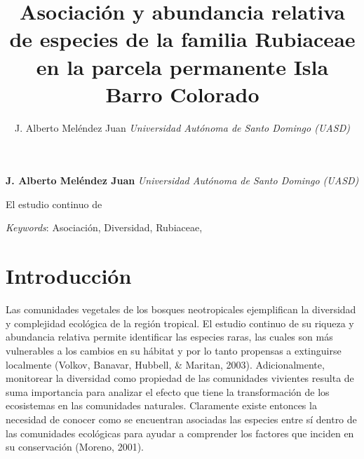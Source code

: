 \documentclass[11pt,]{article}
\title{Asociación y abundancia relativa de especies de la familia Rubiaceae en
la parcela permanente Isla Barro Colorado  }
\author{\Large J. Alberto Meléndez Juan\vspace{0.05in} \newline\normalsize\emph{Universidad Autónoma de Santo Domingo (UASD)}  }
\date{}
\newcommand*{\authorfont}{\fontfamily{phv}\selectfont}
\renewenvironment{abstract}
 {{%
    \setlength{\leftmargin}{0mm}
    \setlength{\rightmargin}{\leftmargin}%
  }%
  \relax}
 {\endlist}
\begin{document}
	
%

{%
\setlength{\parindent}{0pt}
\thispagestyle{plain}
{\fontsize{18}{20}\selectfont\raggedright 
\maketitle  %

}

{
   \vskip 13.5pt\relax \normalsize\fontsize{11}{12} 
\textbf{\authorfont J. Alberto Meléndez Juan} \hskip 15pt \emph{\small Universidad Autónoma de Santo Domingo (UASD)}   

}

}








\begin{abstract}

    \hbox{\vrule height .2pt width 39.14pc}

    \vskip 8.5pt %

\noindent El estudio continuo de


\vskip 8.5pt \noindent \emph{Keywords}: Asociación, Diversidad, Rubiaceae, \par

    \hbox{\vrule height .2pt width 39.14pc}



\end{abstract}


\vskip 6.5pt


\noindent  \section{Introducción}\label{introducciuxf3n}

Las comunidades vegetales de los bosques neotropicales ejemplifican la
diversidad y complejidad ecológica de la región tropical. El estudio
continuo de su riqueza y abundancia relativa permite identificar las
especies raras, las cuales son más vulnerables a los cambios en su
hábitat y por lo tanto propensas a extinguirse localmente (Volkov,
Banavar, Hubbell, \& Maritan, 2003). Adicionalmente, monitorear la
diversidad como propiedad de las comunidades vivientes resulta de suma
importancia para analizar el efecto que tiene la transformación de los
ecosistemas en las comunidades naturales. Claramente existe entonces la
necesidad de conocer como se encuentran asociadas las especies entre sí
dentro de las comunidades ecológicas para ayudar a comprender los
factores que inciden en su conservación (Moreno, 2001).
\end{document}
